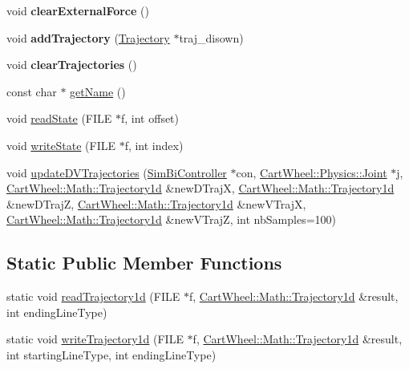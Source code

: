 \begin{DoxyCompactItemize}
\item 
\hypertarget{classCartWheel_1_1Core_1_1SimBiConState_a3d7aeb5716ba82a8303cecd4a70efeaa}{
void {\bfseries clearExternalForce} ()}
\label{classCartWheel_1_1Core_1_1SimBiConState_a3d7aeb5716ba82a8303cecd4a70efeaa}

\item 
\hypertarget{classCartWheel_1_1Core_1_1SimBiConState_a5c57e27d4a2cb8241c507ba82afdcd9a}{
void {\bfseries addTrajectory} (\hyperlink{classCartWheel_1_1Core_1_1Trajectory}{Trajectory} $\ast$traj\_\-disown)}
\label{classCartWheel_1_1Core_1_1SimBiConState_a5c57e27d4a2cb8241c507ba82afdcd9a}

\item 
\hypertarget{classCartWheel_1_1Core_1_1SimBiConState_a76d0efc919c39f0f8873cb2b285b6c2a}{
void {\bfseries clearTrajectories} ()}
\label{classCartWheel_1_1Core_1_1SimBiConState_a76d0efc919c39f0f8873cb2b285b6c2a}

\item 
const char $\ast$ \hyperlink{classCartWheel_1_1Core_1_1SimBiConState_aff254953264318a20a9ce1270d518ec0}{getName} ()
\item 
void \hyperlink{classCartWheel_1_1Core_1_1SimBiConState_adea449bfc8a6d005a87b6bb7a8149ceb}{readState} (FILE $\ast$f, int offset)
\item 
void \hyperlink{classCartWheel_1_1Core_1_1SimBiConState_ac1b1af166a6f804510ea63eb5d9cc036}{writeState} (FILE $\ast$f, int index)
\item 
void \hyperlink{classCartWheel_1_1Core_1_1SimBiConState_ad49b8e2032a48c6bc1a9dba06d601ce5}{updateDVTrajectories} (\hyperlink{classCartWheel_1_1Core_1_1SimBiController}{SimBiController} $\ast$con, \hyperlink{classCartWheel_1_1Physics_1_1Joint}{CartWheel::Physics::Joint} $\ast$j, \hyperlink{classCartWheel_1_1Math_1_1GenericTrajectory}{CartWheel::Math::Trajectory1d} \&newDTrajX, \hyperlink{classCartWheel_1_1Math_1_1GenericTrajectory}{CartWheel::Math::Trajectory1d} \&newDTrajZ, \hyperlink{classCartWheel_1_1Math_1_1GenericTrajectory}{CartWheel::Math::Trajectory1d} \&newVTrajX, \hyperlink{classCartWheel_1_1Math_1_1GenericTrajectory}{CartWheel::Math::Trajectory1d} \&newVTrajZ, int nbSamples=100)
\end{DoxyCompactItemize}
\subsection*{Static Public Member Functions}
\begin{DoxyCompactItemize}
\item 
static void \hyperlink{classCartWheel_1_1Core_1_1SimBiConState_a0549232088e5cb17378e5e76cab36331}{readTrajectory1d} (FILE $\ast$f, \hyperlink{classCartWheel_1_1Math_1_1GenericTrajectory}{CartWheel::Math::Trajectory1d} \&result, int endingLineType)
\item 
static void \hyperlink{classCartWheel_1_1Core_1_1SimBiConState_a6425e0881ce0fd7bafddde8d4e2b6bc3}{writeTrajectory1d} (FILE $\ast$f, \hyperlink{classCartWheel_1_1Math_1_1GenericTrajectory}{CartWheel::Math::Trajectory1d} \&result, int startingLineType, int endingLineType)
\end{DoxyCompactItemize}
